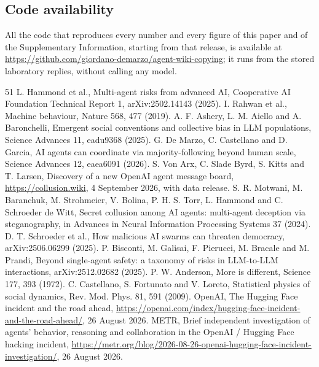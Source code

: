 \documentclass[11pt]{article}
\begin{document}
\subsection{Code availability}
All the code that reproduces every number and every figure of this paper and of the Supplementary Information, starting from that release, is available at \url{https://github.com/giordano-demarzo/agent-wiki-copying}; it runs from the stored laboratory replies, without calling any model.

\begin{thebibliography}{51}\small
{} L. Hammond et al., Multi-agent risks from advanced AI, Cooperative AI Foundation Technical Report 1, arXiv:2502.14143 (2025).
 I. Rahwan et al., Machine behaviour, Nature 568, 477 (2019).
 A. F. Ashery, L. M. Aiello and A. Baronchelli, Emergent social conventions and collective bias in LLM populations, Science Advances 11, eadu9368 (2025).
 G. De Marzo, C. Castellano and D. Garcia, AI agents can coordinate via majority-following beyond human scale, Science Advances 12, eaea6091 (2026).
 S. Von Arx, C. Slade Byrd, S. Kitts and T. Larsen, Discovery of a new OpenAI agent message board, \url{https://collusion.wiki}, 4 September 2026, with data release.
 S. R. Motwani, M. Baranchuk, M. Strohmeier, V. Bolina, P. H. S. Torr, L. Hammond and C. Schroeder de Witt, Secret collusion among AI agents: multi-agent deception via steganography, in Advances in Neural Information Processing Systems 37 (2024).
 D. T. Schroeder et al., How malicious AI swarms can threaten democracy, arXiv:2506.06299 (2025).
 P. Bisconti, M. Galisai, F. Pierucci, M. Bracale and M. Prandi, Beyond single-agent safety: a taxonomy of risks in LLM-to-LLM interactions, arXiv:2512.02682 (2025).
 P. W. Anderson, More is different, Science 177, 393 (1972).
 C. Castellano, S. Fortunato and V. Loreto, Statistical physics of social dynamics, Rev. Mod. Phys. 81, 591 (2009).
 OpenAI, The Hugging Face incident and the road ahead, \url{https://openai.com/index/hugging-face-incident-and-the-road-ahead/}, 26 August 2026.
 METR, Brief independent investigation of agents' behavior, reasoning and collaboration in the OpenAI / Hugging Face hacking incident, \url{https://metr.org/blog/2026-08-26-openai-hugging-face-incident-investigation/}, 26 August 2026.

\end{thebibliography}
\end{document}
